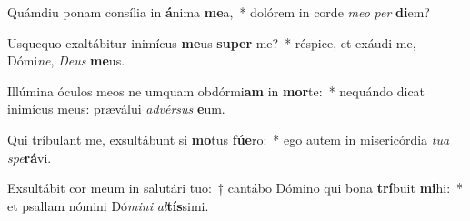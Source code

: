 \item Quámdiu ponam consília in \textbf{á}nima \textbf{me}a,~* dolórem in corde \textit{me}\textit{o} \textit{per} \textbf{di}em?
\item Usquequo exaltábitur inimícus \textbf{me}us \textbf{su}\textbf{per} me?~* réspice, et exáudi me, Dómi\textit{ne}, \textit{De}\textit{us} \textbf{me}us.
\item Illúmina óculos meos ne umquam obdórmi\textbf{am} in \textbf{mor}te:~* nequándo dicat inimícus meus: præválui \textit{ad}\textit{vér}\textit{sus} \textbf{e}um.
\item Qui tríbulant me, exsultábunt si \textbf{mo}tus \textbf{fú}\textbf{e}ro:~* ego autem in misericórdia \textit{tu}\textit{a} \textit{spe}\textbf{rá}vi.
\item Exsultábit cor meum in salutári tuo:~† cantábo Dómino qui bona \textbf{trí}buit \textbf{mi}hi:~* et psallam nómini Dó\textit{mi}\textit{ni} \textit{al}\textbf{tís}simi.
